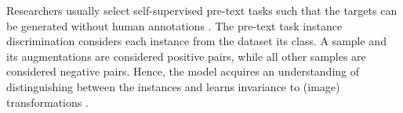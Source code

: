 Researchers usually select self-supervised pre-text tasks such that 
the targets can be generated without human annotations \citet{PIC_2020}.
The pre-text task instance discrimination considers each instance from the dataset its class.
A sample and its augmentations are considered positive pairs, 
while all other samples are considered negative pairs.
Hence, the model acquires an understanding of distinguishing between the instances and 
learns invariance to (image) transformations \citet{PIC_2020,swav_2020,local_aggr_2019,grape_2024,CL_temp_2021}.